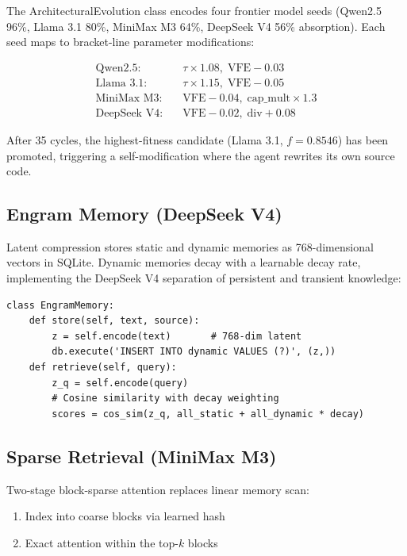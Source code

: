 \documentclass[11pt,a4paper]{article}
\begin{document}
The ArchitecturalEvolution class encodes four frontier model seeds
(Qwen2.5 96\%, Llama 3.1 80\%, MiniMax M3 64\%, DeepSeek V4 56\%
absorption). Each seed maps to bracket-line parameter modifications:

\begin{equation}
\begin{aligned}
\text{Qwen2.5:} &\quad \tau \times 1.08,\; \text{VFE} - 0.03 \\
\text{Llama 3.1:} &\quad \tau \times 1.15,\; \text{VFE} - 0.05 \\
\text{MiniMax M3:} &\quad \text{VFE} - 0.04,\; \text{cap\_mult} \times 1.3 \\
\text{DeepSeek V4:} &\quad \text{VFE} - 0.02,\; \text{div} + 0.08
\end{aligned}
\end{equation}

After 35 cycles, the highest-fitness candidate (Llama 3.1, \(f = 0.8546\))
has been promoted, triggering a self-modification where the agent rewrites
its own source code.

\subsection{Engram Memory (DeepSeek V4)}

Latent compression stores static and dynamic memories as 768-dimensional
vectors in SQLite. Dynamic memories decay with a learnable decay rate,
implementing the DeepSeek V4 separation of persistent and transient
knowledge:

\begin{lstlisting}[caption={Engram latent compression}]
class EngramMemory:
    def store(self, text, source):
        z = self.encode(text)       # 768-dim latent
        db.execute('INSERT INTO dynamic VALUES (?)', (z,))
    def retrieve(self, query):
        z_q = self.encode(query)
        # Cosine similarity with decay weighting
        scores = cos_sim(z_q, all_static + all_dynamic * decay)
\end{lstlisting}

\subsection{Sparse Retrieval (MiniMax M3)}

Two-stage block-sparse attention replaces linear memory scan:

\begin{enumerate}
\item Index into coarse blocks via learned hash
\item Exact attention within the top-\(k\) blocks
\end{enumerate}
\end{document}
